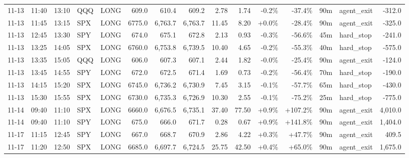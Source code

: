 \documentclass[11pt,a4paper,twoside]{article}
\begin{document}
\begin{landscape}
\begin{center}
\begin{longtable}{>{\color{txtmain}}l l l l l r r r r r r r r >{\color{txtmain}}l r}
11-13 & 11:40 & 13:10 & QQQ & LONG & 609.0 & 610.4 & 609.2 & 2.78 & 1.74 & \textcolor{lossred}{-0.2\%} & \textcolor{lossred}{-37.4\%} & 90m & agent\_exit & \textcolor{lossred}{-312.0} \\
11-13 & 11:45 & 13:15 & SPX & LONG & 6775.0 & 6,763.7 & 6,763.7 & 11.45 & 8.20 & \textcolor{wingreen}{+0.0\%} & \textcolor{lossred}{-28.4\%} & 90m & agent\_exit & \textcolor{lossred}{-325.0} \\
11-13 & 12:45 & 13:30 & SPY & LONG & 674.0 & 675.1 & 672.8 & 2.13 & 0.93 & \textcolor{lossred}{-0.3\%} & \textcolor{lossred}{-56.6\%} & 45m & hard\_stop & \textcolor{lossred}{-241.0} \\
11-13 & 13:25 & 14:05 & SPX & LONG & 6760.0 & 6,753.8 & 6,739.5 & 10.40 & 4.65 & \textcolor{lossred}{-0.2\%} & \textcolor{lossred}{-55.3\%} & 40m & hard\_stop & \textcolor{lossred}{-575.0} \\
11-13 & 13:35 & 15:05 & QQQ & LONG & 606.0 & 607.3 & 607.1 & 2.44 & 1.82 & \textcolor{lossred}{-0.0\%} & \textcolor{lossred}{-25.4\%} & 90m & agent\_exit & \textcolor{lossred}{-124.0} \\
11-13 & 13:45 & 14:55 & SPY & LONG & 672.0 & 672.5 & 671.4 & 1.69 & 0.73 & \textcolor{lossred}{-0.2\%} & \textcolor{lossred}{-56.4\%} & 70m & hard\_stop & \textcolor{lossred}{-190.0} \\
11-13 & 14:15 & 15:20 & SPX & LONG & 6745.0 & 6,736.2 & 6,730.9 & 7.45 & 3.15 & \textcolor{lossred}{-0.1\%} & \textcolor{lossred}{-57.7\%} & 65m & hard\_stop & \textcolor{lossred}{-430.0} \\
11-13 & 15:30 & 15:55 & SPX & LONG & 6730.0 & 6,735.3 & 6,726.9 & 10.30 & 2.55 & \textcolor{lossred}{-0.1\%} & \textcolor{lossred}{-75.2\%} & 25m & hard\_stop & \textcolor{lossred}{-775.0} \\
11-14 & 09:40 & 11:10 & SPX & LONG & 6660.0 & 6,676.5 & 6,735.1 & 37.40 & 77.50 & \textcolor{wingreen}{+0.9\%} & \textcolor{wingreen}{+107.2\%} & 90m & agent\_exit & \textcolor{wingreen}{4,010.0} \\
11-14 & 09:40 & 11:10 & SPY & LONG & 675.0 & 666.0 & 671.7 & 0.28 & 0.67 & \textcolor{wingreen}{+0.9\%} & \textcolor{wingreen}{+141.8\%} & 90m & agent\_exit & \textcolor{wingreen}{1,404.0} \\
11-17 & 11:15 & 12:45 & SPY & LONG & 667.0 & 668.7 & 670.9 & 2.86 & 4.22 & \textcolor{wingreen}{+0.3\%} & \textcolor{wingreen}{+47.7\%} & 90m & agent\_exit & \textcolor{wingreen}{409.5} \\
11-17 & 11:20 & 12:50 & SPX & LONG & 6685.0 & 6,697.7 & 6,724.5 & 25.75 & 42.50 & \textcolor{wingreen}{+0.4\%} & \textcolor{wingreen}{+65.0\%} & 90m & agent\_exit & \textcolor{wingreen}{1,675.0} \\

\end{longtable}
\end{center}
\end{landscape}
\end{document}
